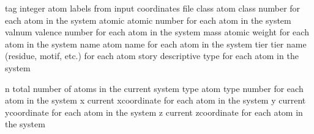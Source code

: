 \documentclass[letterpaper,11pt,english]{sphinxmanual}
\begin{document}
\sphinxAtStartPar
{}

\begin{sphinxVerbatim}[commandchars=\\\{\}]
tag             integer atom labels from input coordinates file
class           atom class number for each atom in the system
atomic          atomic number for each atom in the system
valnum          valence number for each atom in the system
mass            atomic weight for each atom in the system
name            atom name for each atom in the system
tier            tier name (residue, motif, etc.) for each atom
story           descriptive type for each atom in the system
\end{sphinxVerbatim}

\sphinxAtStartPar
{}

\begin{sphinxVerbatim}[commandchars=\\\{\}]
n               total number of atoms in the current system
type            atom type number for each atom in the system
x               current x\PYGZhy{}coordinate for each atom in the system
y               current y\PYGZhy{}coordinate for each atom in the system
z               current z\PYGZhy{}coordinate for each atom in the system
\end{sphinxVerbatim}

\sphinxAtStartPar
{}
\end{document}
